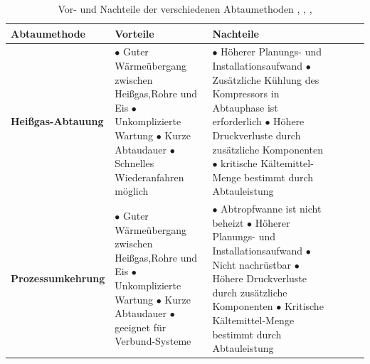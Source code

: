 \begin{table}[htb]
\centering
\caption{Vor- und Nachteile der verschiedenen Abtaumethoden   	\citep{Breidenbach2014}, \citep{Refrigeration2000}, \citep{Yin2012}, \citep{Huang20091697}
} \vspace{6pt}

\label{fig:PCM_Slurry1}
\begin{tabular}{p{3.8cm}p{5.6cm}p{5.6cm}lll}
\hline
\textbf{Abtaumethode} &\textbf{Vorteile} & \textbf{Nachteile}\\
\hline
\hline

\textbf{Heißgas-Abtauung} 
&
$\bullet$ Guter Wärmeübergang zwischen Heißgas,Rohre und Eis
\newline								  			
$\bullet$ Unkomplizierte Wartung
\newline			  
$\bullet$ Kurze Abtaudauer		
\newline			
$\bullet$ Schnelles Wiederanfahren möglich	

&$\bullet$ Höherer Planungs- und Installationsaufwand  
\newline
$\bullet$ Zusätzliche Kühlung des Kompressors in Abtauphase ist erforderlich 
\newline 
$\bullet$ Höhere Druckverluste durch zusätzliche Komponenten 
\newline
$\bullet$ kritische Kältemittel-Menge bestimmt durch Abtauleistung \\  
   
\hline
\textbf{Prozessumkehrung}
&$\bullet$ Guter Wärmeübergang zwischen Heißgas,Rohre und Eis  													
\newline								
$\bullet$ Unkomplizierte Wartung
\newline	
$\bullet$ Kurze Abtaudauer		
\newline			 
$\bullet$ geeignet für Verbund-Systeme		
&$\bullet$ Abtropfwanne ist nicht beheizt   
\newline
$\bullet$ Höherer Planungs- und Installationsaufwand
\newline
$\bullet$ Nicht nachrüstbar
\newline
$\bullet$ Höhere Druckverluste durch zusätzliche Komponenten								
\newline
$\bullet$ Kritische Kältemittel-Menge bestimmt durch Abtauleistung\\



\end{tabular}
\end{table}
